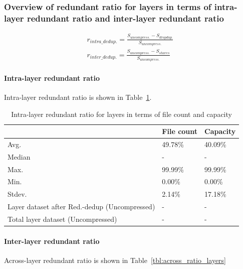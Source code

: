 \subsubsection{Overview of redundant ratio for layers in terms of intra-layer redundant ratio and inter-layer redundant ratio}

\begin{eqnarray}
r_{intra\_dedup.} = \frac{S_{uncompress.} - S_{dropdup.}}{S_{uncompress.}} \\
r_{inter\_dedup.} = \frac{S_{uncompress.} - S_{shares}}{S_{uncompress.}}
\end{eqnarray}

\paragraph{Intra-layer redundant ratio} Intra-layer redundant ratio is shown in Table~\ref{tbl:per_ratio_layers}.

\begin{table} 
	\centering 
	\scriptsize  
	\caption{Intra-layer redundant ratio for layers in terms of file count and capacity} \label{tbl:per_ratio_layers} 
	\begin{tabular}{|l|l|l|}%
		\hline 
		& File count & Capacity \\
		\hline
		Avg. & 49.78\% & 40.09\%\\
		\hline
		Median & - & - \\
		\hline
		Max. & 99.99\% & 99.99\%\\
		\hline
		Min.  & 0.00\%  & 0.00\%\\
		\hline
		Stdev.  &  2.14\% & 17.18\%\\
		\hline
		Layer dataset after Red.-dedup (Uncompressed) & -  & -\\
		\hline 
		Total layer dataset (Uncompressed) &  -	& -\\
		\hline 
	\end{tabular} 
\end{table}

\paragraph{Inter-layer redundant ratio} Across-layer redundant ratio is shown in Table~\ref{tbl:across_ratio_layers}

